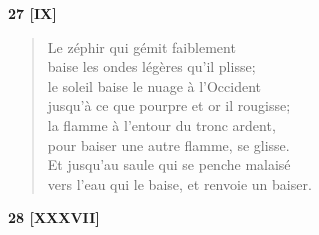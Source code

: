 \documentclass[a4paper,11pt]{book}
\begin{document}
\bigskip

\begin{center} {\bf 27 [IX]} \end{center}

\begin{verse}
Le zéphir qui gémit faiblement \\
baise les ondes légères qu'il plisse; \\
le soleil baise le nuage à l'Occident \\
jusqu'à ce que pourpre et or il rougisse; \\
la flamme à l'entour du tronc ardent, \\
pour baiser une autre flamme, se glisse. \\
Et jusqu'au saule qui se penche malaisé \\
vers l'eau qui le baise, et renvoie un baiser. \\
\end{verse}

\bigskip

\begin{center} {\bf 28 [XXXVII]} \end{center}
\end{document}
